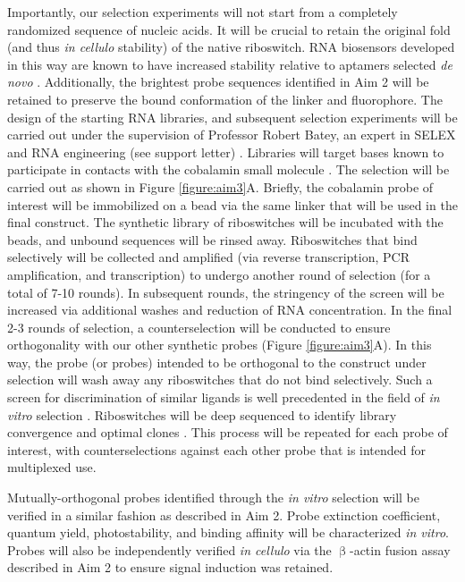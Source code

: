 Importantly, our selection experiments will not start from a completely randomized sequence of nucleic acids. It will be crucial to retain the original fold (and thus \textit{in cellulo} stability) of the native riboswitch. RNA biosensors developed in this way are known to have increased stability relative to aptamers selected \textit{de novo} \cite{PorterRecurrentRNAmotifs2017}.
Additionally, the brightest probe sequences identified in Aim 2 will be retained to preserve the bound conformation of the linker and fluorophore.
The design of the starting RNA libraries, and subsequent selection experiments will be carried out under the supervision of Professor Robert Batey, an expert in SELEX and RNA engineering (see support letter) \cite{TrauschChapterThreeDesign2015,PorterRecurrentRNAmotifs2017}.
Libraries will target bases known to participate in contacts with the cobalamin small molecule \cite{JohnsonJrB12cofactorsdirectly2012,PorterRecurrentRNAmotifs2017}.
The selection will be carried out as shown in Figure \ref{figure:aim3}A. Briefly, the cobalamin probe of interest will be immobilized on a bead via the same linker that will be used in the final construct.
The synthetic library of riboswitches will be incubated with the beads, and unbound sequences will be rinsed away.
Riboswitches that bind selectively will be collected and amplified (via reverse transcription, PCR amplification, and transcription) to undergo another round of selection (for a total of 7-10 rounds).
In subsequent rounds, the stringency of the screen will be increased via additional washes and reduction of RNA concentration.
In the final 2-3 rounds of selection, a counterselection will be conducted to ensure orthogonality with our other synthetic probes (Figure \ref{figure:aim3}A). In this way, the probe (or probes) intended to be orthogonal to the construct under selection will wash away any riboswitches that do not bind selectively.
Such a screen for discrimination of similar ligands is well precedented in the field of \textit{in vitro} selection \cite{FamulokMolecularRecognitionAmino1994,GeigerRNAAptamersThat1996}.
Riboswitches will be deep sequenced to identify library convergence and optimal clones \cite{PorterRecurrentRNAmotifs2017}. This process will be repeated for each probe of interest, with counterselections against each other probe that is intended for multiplexed use.

Mutually-orthogonal probes identified through the \textit{in vitro} selection will be verified in a similar fashion as described in Aim 2. Probe extinction coefficient, quantum yield, photostability, and binding affinity will be characterized \textit{in vitro}. Probes will also be independently verified \textit{in cellulo} via the $\upbeta$-actin fusion assay described in Aim 2 to ensure signal induction was retained.


